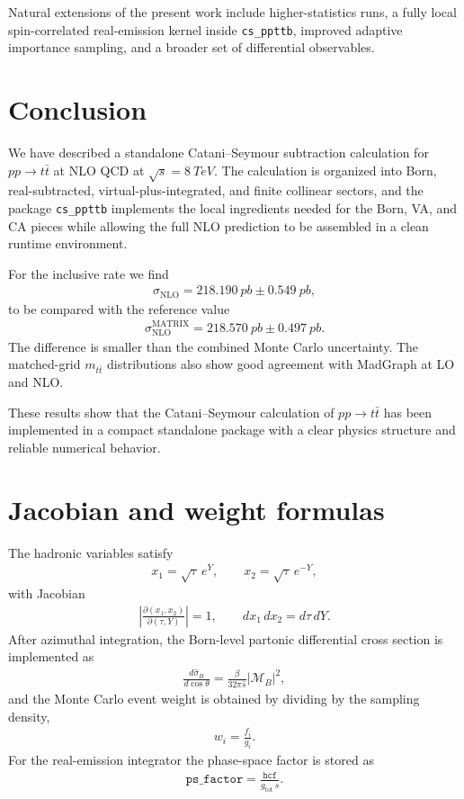 \documentclass[11pt]{article}
\begin{document}
Natural extensions of the present work include higher-statistics runs, a fully local spin-correlated real-emission kernel inside \texttt{cs\_ppttb}, improved adaptive importance sampling, and a broader set of differential observables.

\section{Conclusion}

We have described a standalone Catani--Seymour subtraction calculation for $pp\to t\bar t$ at NLO QCD at $\sqrt{s}=\SI{8}{TeV}$.
The calculation is organized into Born, real-subtracted, virtual-plus-integrated, and finite collinear sectors, and the package \texttt{cs\_ppttb} implements the local ingredients needed for the Born, VA, and CA pieces while allowing the full NLO prediction to be assembled in a clean runtime environment.

For the inclusive rate we find
\begin{align}
\sigma_{\text{NLO}} = \SI{218.190}{pb} \pm \SI{0.549}{pb},
\end{align}
to be compared with the reference value
\begin{align}
\sigma_{\text{NLO}}^{\text{MATRIX}} = \SI{218.570}{pb} \pm \SI{0.497}{pb}.
\end{align}
The difference is smaller than the combined Monte Carlo uncertainty. The matched-grid $m_{t\bar t}$ distributions also show good agreement with MadGraph at LO and NLO.

These results show that the Catani--Seymour calculation of $pp\to t\bar t$ has been implemented in a compact standalone package with a clear physics structure and reliable numerical behavior.

\appendix

\section{Jacobian and weight formulas}

The hadronic variables satisfy
\begin{align}
x_1 = \sqrt{\tau}\,e^Y,
\qquad
x_2 = \sqrt{\tau}\,e^{-Y},
\end{align}
with Jacobian
\begin{align}
\left|\frac{\partial(x_1,x_2)}{\partial(\tau,Y)}\right| = 1,
\qquad
dx_1\,dx_2 = d\tau\,dY.
\end{align}
After azimuthal integration, the Born-level partonic differential cross section is implemented as
\begin{align}
\frac{d\hat\sigma_B}{d\cos\theta} = \frac{\beta}{32\pi\hat s}|\mathcal{M}_B|^2,
\end{align}
and the Monte Carlo event weight is obtained by dividing by the sampling density,
\begin{align}
w_i = \frac{f_i}{g_i}.
\end{align}
For the real-emission integrator the phase-space factor is stored as
\begin{align}
\texttt{ps\_factor} = \frac{\texttt{hcf}}{g_{\text{tot}}\,\hat s}.
\end{align}
\end{document}
